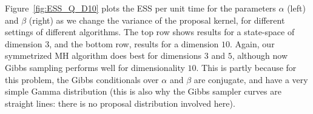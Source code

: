 {  %
  Figure~\ref{fig:ESS_Q_D10} plots the ESS 
  per unit time for the parameters $\alpha$ (left) and $\beta$ (right) as we 
  change the variance of the proposal kernel, for different settings of
  different algorithms. The top row shows results for a state-space
  of dimension $3$, and the bottom row, results for a dimension
  $10$.
  Again, our symmetrized  MH algorithm does best for dimensions
  $3$ and $5$, although now Gibbs sampling performs well for dimensionality $10$.
  This is partly because for this problem, the Gibbs conditionals over $\alpha$
  and $\beta$ are conjugate, and have a very simple Gamma distribution
  (this is also why the Gibbs sampler curves are straight lines: there is no
  proposal distribution involved here).
}
